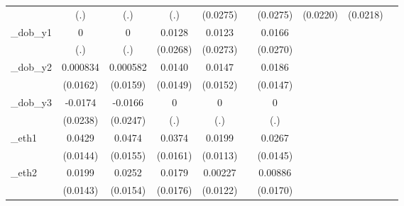 \begin{table}[htbp]
\begin{tabular}{l*{9}{c}}
            &         (.)         &         (.)         &         (.)         &    (0.0275)         &                     &    (0.0275)         &    (0.0220)         &    (0.0218)         &                     \\
[1em]
\_dob\_y1     &           0         &           0         &      0.0128         &      0.0123         &                     &      0.0166         &                     &                     &                     \\
            &         (.)         &         (.)         &    (0.0268)         &    (0.0273)         &                     &    (0.0270)         &                     &                     &                     \\
[1em]
\_dob\_y2     &    0.000834         &    0.000582         &      0.0140         &      0.0147         &                     &      0.0186         &                     &                     &                     \\
            &    (0.0162)         &    (0.0159)         &    (0.0149)         &    (0.0152)         &                     &    (0.0147)         &                     &                     &                     \\
[1em]
\_dob\_y3     &     -0.0174         &     -0.0166         &           0         &           0         &                     &           0         &                     &                     &                     \\
            &    (0.0238)         &    (0.0247)         &         (.)         &         (.)         &                     &         (.)         &                     &                     &                     \\
[1em]
\_eth1       &      0.0429\sym{***}&      0.0474\sym{***}&      0.0374\sym{**} &      0.0199\sym{*}  &                     &      0.0267\sym{*}  &                     &                     &                     \\
            &    (0.0144)         &    (0.0155)         &    (0.0161)         &    (0.0113)         &                     &    (0.0145)         &                     &                     &                     \\
[1em]
\_eth2       &      0.0199         &      0.0252         &      0.0179         &     0.00227         &                     &     0.00886         &                     &                     &                     \\
            &    (0.0143)         &    (0.0154)         &    (0.0176)         &    (0.0122)         &                     &    (0.0170)         &                     &                     &                     \\

\end{tabular}
\end{table}
